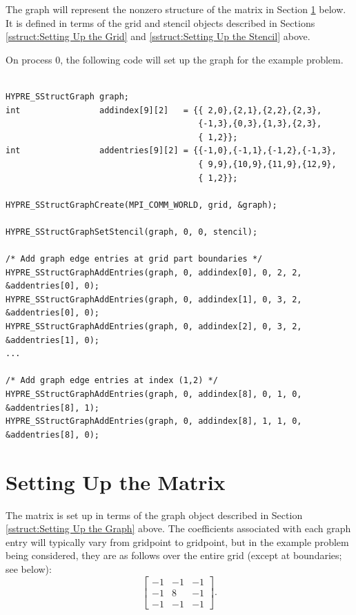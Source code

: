 The graph will represent the nonzero structure of the matrix in
Section \ref{sstruct:Setting Up the Matrix} below.  It is defined in
terms of the grid and stencil objects described in Sections
\ref{sstruct:Setting Up the Grid} and \ref{sstruct:Setting Up the
Stencil} above.

On process 0, the following code will set up the graph for the
example problem.
\begin{display}
\begin{verbatim}

HYPRE_SStructGraph graph;
int                addindex[9][2]   = {{ 2,0},{2,1},{2,2},{2,3},
                                       {-1,3},{0,3},{1,3},{2,3},
                                       { 1,2}};
int                addentries[9][2] = {{-1,0},{-1,1},{-1,2},{-1,3},
                                       { 9,9},{10,9},{11,9},{12,9},
                                       { 1,2}};

HYPRE_SStructGraphCreate(MPI_COMM_WORLD, grid, &graph);

HYPRE_SStructGraphSetStencil(graph, 0, 0, stencil);

/* Add graph edge entries at grid part boundaries */
HYPRE_SStructGraphAddEntries(graph, 0, addindex[0], 0, 2, 2, &addentries[0], 0);
HYPRE_SStructGraphAddEntries(graph, 0, addindex[1], 0, 3, 2, &addentries[0], 0);
HYPRE_SStructGraphAddEntries(graph, 0, addindex[2], 0, 3, 2, &addentries[1], 0);
...

/* Add graph edge entries at index (1,2) */
HYPRE_SStructGraphAddEntries(graph, 0, addindex[8], 0, 1, 0, &addentries[8], 1);
HYPRE_SStructGraphAddEntries(graph, 0, addindex[8], 1, 1, 0, &addentries[8], 0);

\end{verbatim}
\end{display}


\section{Setting Up the Matrix}
\label{sstruct:Setting Up the Matrix}

The matrix is set up in terms of the graph object described in Section
\ref{sstruct:Setting Up the Graph} above.  The coefficients associated
with each graph entry will typically vary from gridpoint to gridpoint,
but in the example problem being considered, they are as follows over
the entire grid (except at boundaries; see below):
\begin{equation}\label{sstruct:eqn-stencil-laplacian}
\left [
\begin{array}{ccc}
 -1 & -1 & -1 \\
 -1 &  8 & -1 \\
 -1 & -1 & -1 
\end{array}
\right ] .
\end{equation}

